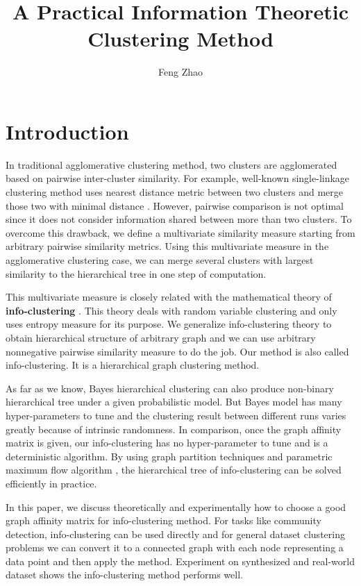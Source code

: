 \documentclass{article}
\title{A Practical Information Theoretic Clustering Method}
\author{
  Feng Zhao
}
\begin{document}

\maketitle

\begin{abstract}

\end{abstract}

\section{Introduction}
In traditional agglomerative clustering method, two clusters are agglomerated based on pairwise inter-cluster similarity.  For example, well-known single-linkage clustering method uses nearest distance metric between two clusters and merge those two with minimal distance \cite{RN16}.  However, pairwise comparison is not optimal since it does not consider information shared between more than two clusters.  To overcome this drawback, we define a multivariate similarity measure starting from arbitrary pairwise similarity metrics. Using this multivariate measure in the agglomerative clustering case, we can merge several clusters with largest similarity to the hierarchical tree in one step of computation.

This multivariate measure is closely related with the mathematical theory of \textbf{info-clustering} \cite{RN1}. This theory deals with random variable clustering and only uses entropy measure for its purpose. We generalize info-clustering theory to obtain hierarchical structure of arbitrary graph and we can use arbitrary nonnegative pairwise similarity measure to do the job. Our method is also called info-clustering. It is a hierarchical graph clustering method. 

As far as we know, Bayes hierarchical clustering \cite{Heller2005Bayesian} can also produce non-binary hierarchical tree under a given probabilistic model. But Bayes model has many hyper-parameters to tune and the clustering result between different runs varies greatly because of intrinsic randomness. In comparison, once the graph affinity matrix is given, our info-clustering has no hyper-parameter to tune and is a deterministic algorithm. By using graph partition techniques \cite{RN3} and parametric maximum flow algorithm \cite{RN4}, the hierarchical tree of info-clustering can be solved efficiently in practice. 

 In this paper, we discuss theoretically and experimentally how to choose a good graph affinity matrix for info-clustering method. For tasks like community detection, info-clustering can be used directly and for general dataset clustering problems we can convert it to a connected graph with each node representing a data point and then apply the method. Experiment on synthesized and real-world dataset shows the info-clustering method performs well. 
\end{document}
